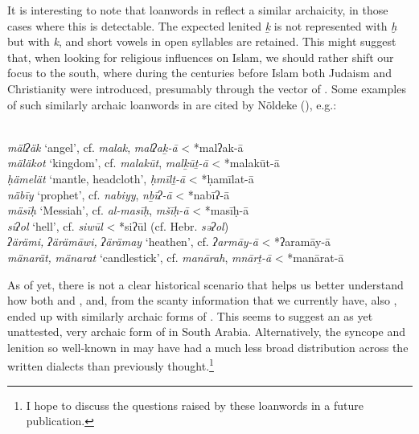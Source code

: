 \documentclass[output=paper]{langsci/langscibook}
\begin{document}
It is interesting to note that  {loanwords} in  reflect a similar archaicity, in those cases where this is detectable. The expected lenited \textit{ḵ} is not represented with  \textit{ḫ} but with \textit{k}, and short vowels in open syllables are retained. This might suggest that, when looking for religious influences on Islam, we should rather shift our focus to the south, where during the centuries before Islam both Judaism and Christianity were introduced, presumably through the vector of . Some examples of such similarly archaic  {loanwords} in  are cited by Nöldeke (\citeyear[31--46]{Nöldeke1910}), e.g.:

\ea {}\\
\ea \textit{mälʔäk} ‘angel’, cf.  \textit{malak},  \textit{malʔaḵ-ā} < *malʔak-ā\\
\ex \textit{mäläkot} ‘kingdom’, cf.  \textit{malakūt},  \textit{malḵūṯ-ā} < *malakūt-ā\\
\ex \textit{ḥämelät} ‘mantle, headcloth’,  \textit{ḥmīlṯ-ā} < *ḥamīlat-ā\\
\ex \textit{näbīy} ‘prophet’, cf.  \textit{nabiyy},  \textit{nḇīʔ{}-ā} < *nabīʔ-ā\\
\ex \textit{mäsīḥ} ‘Messiah’, cf.  \textit{al-masīḥ},  \textit{mšīḥ-ā} < *masīḥ-ā\\
\ex \textit{siʔol} ‘hell’, cf.  \textit{siwūl} < *siʔūl (cf. Hebr. \textit{səʔol})\\
\ex \textit{ʔärämi,} \textit{ʔärämāwi,} \textit{ʔärämay} ‘heathen’, cf.  \textit{ʔarmāy-ā} < *ʔaramāy-ā\\
\ex \textit{mänarät,} \textit{mänarat} ‘candlestick’, cf.  \textit{manārah},  \textit{mnārṯ-ā} < *manārat-ā
\z
\z

As of yet, there is not a clear historical scenario that helps us better understand how both  and , and, from the scanty information that we currently have, also , ended up with similarly archaic forms of . This seems to suggest an as yet unattested, very archaic form of  in South Arabia. Alternatively, the syncope and lenition so well-known in  may have had a much less broad distribution across the written  dialects than previously thought.\footnote{I hope to discuss the {questions} raised by these {loanwords} in a {future} publication.}
\end{document}
